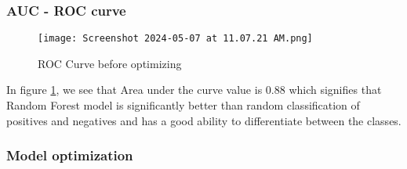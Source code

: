 \documentclass[10pt]{article}
\begin{document}
\subsubsection{AUC - ROC curve}
\begin{figure}[h]
    \centering
    \texttt{[image: Screenshot 2024-05-07 at 11.07.21 AM.png]}
    \caption{ROC Curve before optimizing}
    \label{fig:roc-krishna}
\end{figure}
In figure \ref{fig:roc-krishna}, we see that Area under the curve value is 0.88 which signifies that Random Forest model is significantly better than random classification of positives and negatives and has a good ability to differentiate between the classes.


\subsubsection{Model optimization}
\end{document}
